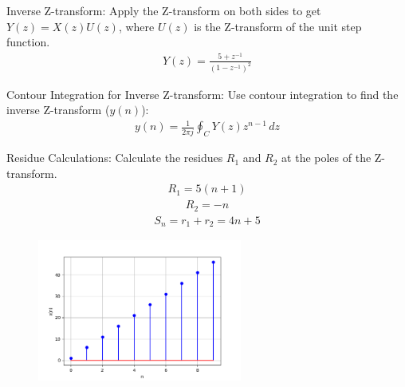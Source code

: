\documentclass[journal,12pt,twocolumn]{IEEEtran}
\theoremstyle{remark}
\begin{document}
Inverse Z-transform:
Apply the Z-transform on both sides to get \( Y(z) = X(z)U(z) \), where \( U(z) \) is the Z-transform of the unit step function.
\begin{align}
Y(z) = \frac{5 + z^{-1}}{(1 - z^{-1})^2}
\end{align}

Contour Integration for Inverse Z-transform:
Use contour integration to find the inverse Z-transform (\( y(n) \)):
\begin{align}
y(n) = \frac{1}{2\pi j} \oint_C Y(z)z^{n-1} \,dz
\end{align}

Residue Calculations:
Calculate the residues \( R_1 \) and \( R_2 \) at the poles of the Z-transform.
\begin{align}
R_1 = 5(n+1) 
\end{align}
\begin{align}
R_2 = -n
\end{align}
\begin{align}
S_n = r_1 + r_2 = 4n + 5
\end{align}

\begin{figure}[h]
  \centering
  \includegraphics[width=0.6\textwidth]{figs/stem.png}
 
  \label{fig:Stem_Plot}
\end{figure}
\end{document}
